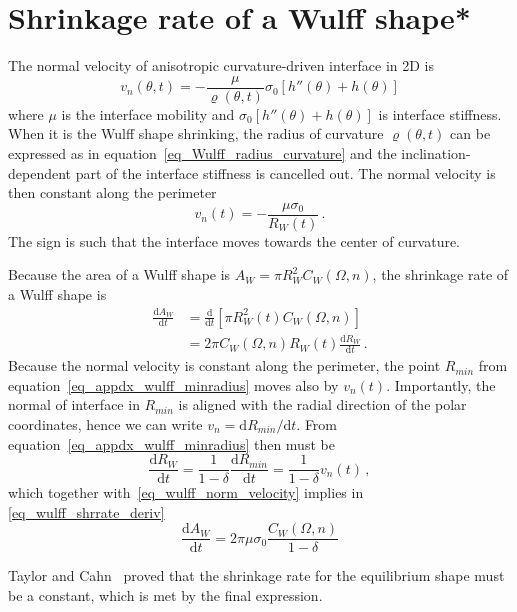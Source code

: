 \section{Shrinkage rate of a Wulff shape*} \label{sec_appendix_wulff_shrrate}
The normal velocity of anisotropic curvature-driven interface in 2D is~\cite{Abdeljawad2018}
\begin{equation}
	v_n(\theta,t)=-\frac{\mu}{\varrho(\theta,t)}\sigma_0[h''(\theta) + h(\theta)] 
\end{equation}
where $\mu$ is the interface mobility and $\sigma_0[h''(\theta) + h(\theta)]$ is interface stiffness. When it is the
Wulff shape shrinking, the radius of curvature $\varrho(\theta,t)$ can be expressed as in equation~\eqref{eq_Wulff_radius_curvature} and the inclination-dependent part of the interface stiffness is cancelled out. The normal velocity is then constant along the perimeter
\begin{equation} \label{eq_wulff_norm_velocity}
	v_n(t) = - \frac{\mu \sigma_0}{R_W(t)} \,.
\end{equation}
The sign is such that the interface moves towards the center of curvature.

Because the area of a Wulff shape is $A_W=\pi R_W^2C_W(\Omega,n)$, the shrinkage rate of a Wulff shape is
\begin{equation}\label{eq_wulff_shrrate_deriv}
	\begin{split}
		\frac{\mathrm{d}A_W}{\mathrm{d}t} &= \frac{\mathrm{d}}{\mathrm{d}t}[\pi R_W^2(t)C_W(\Omega,n)]    \\
		&= 2\pi C_W(\Omega,n) R_W(t) \frac{\mathrm{d}R_W}{\mathrm{d}t} \,.
	\end{split}
\end{equation}
Because  the normal velocity is constant along the perimeter, the point $R_{min}$ from equation~\eqref{eq_appdx_wulff_minradius} moves also by $v_n(t)$. Importantly, the normal of interface in $R_{min}$ is aligned with the radial direction of the polar coordinates, hence we can write $v_n=\mathrm{d}R_{min}/\mathrm{d}t$. From equation~\eqref{eq_appdx_wulff_minradius} then must be
\begin{equation}
	\frac{\mathrm{d}R_{W}}{\mathrm{d}t}=\frac{1}{1-\delta}\frac{\mathrm{d}R_{min}}{\mathrm{d}t}=\frac{1}{1-\delta}v_n(t) \,,
\end{equation}
which together with~\ref{eq_wulff_norm_velocity} implies in \ref{eq_wulff_shrrate_deriv}
\begin{equation}
	\frac{\mathrm{d}A_W}{\mathrm{d}t} = 2\pi\mu\sigma_0  \frac{C_W(\Omega,n)}{1-\delta} 
\end{equation}

Taylor and Cahn~\cite{Taylor1998} proved that the shrinkage rate for the equilibrium shape must be a constant, which is met by the final expression.



\cleardoublepage

